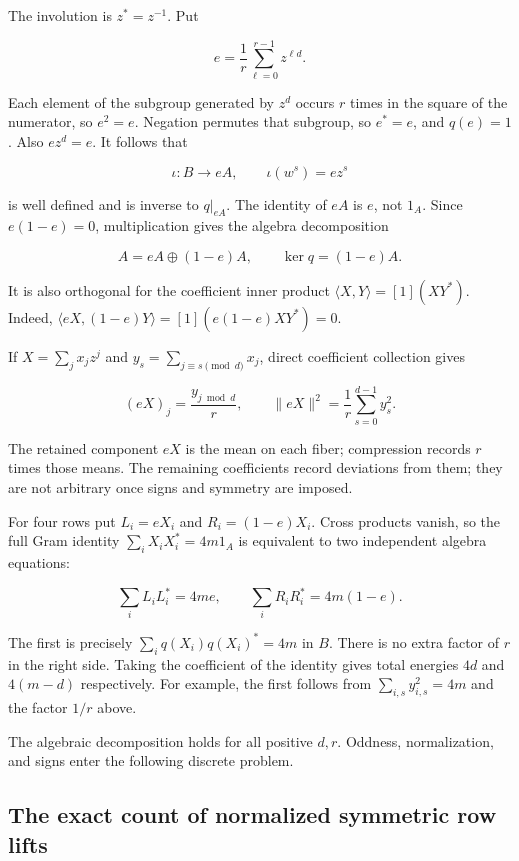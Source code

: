 \documentclass[
  11pt,
]{article}
\begin{document}
The involution is \(z^*=z^{-1}\). Put

\[e=\frac1r\sum_{\ell=0}^{r-1}z^{\ell d}.\]

Each element of the subgroup generated by \(z^d\) occurs \(r\) times in
the square of the numerator, so \(e^2=e\). Negation permutes that
subgroup, so \(e^*=e\), and \(q(e)=1\). Also \(ez^d=e\). It follows that

\[\iota:B\longrightarrow eA,\qquad \iota(w^s)=ez^s\]

is well defined and is inverse to \(q|_{eA}\). The identity of \(eA\) is
\(e\), not \(1_A\). Since \(e(1-e)=0\), multiplication gives the algebra
decomposition

\[A=eA\oplus(1-e)A,\qquad \ker q=(1-e)A.\]

It is also orthogonal for the coefficient inner product
\(\langle X,Y\rangle=[1](XY^*)\). Indeed,
\(\langle eX,(1-e)Y\rangle=[1](e(1-e)XY^*)=0\).

If \(X=\sum_jx_jz^j\) and \(y_s=\sum_{j\equiv s\pmod d}x_j\), direct
coefficient collection gives

\[(eX)_j=\frac{y_{j\bmod d}}r,\qquad
\|eX\|^2=\frac1r\sum_{s=0}^{d-1}y_s^2.\]

The retained component \(eX\) is the mean on each fiber; compression
records \(r\) times those means. The remaining coefficients record
deviations from them; they are not arbitrary once signs and symmetry are
imposed.

For four rows put \(L_i=eX_i\) and \(R_i=(1-e)X_i\). Cross products
vanish, so the full Gram identity \(\sum_iX_iX_i^*=4m1_A\) is equivalent
to two independent algebra equations:

\[\sum_iL_iL_i^*=4me,\qquad
\sum_iR_iR_i^*=4m(1-e).\]

The first is precisely \(\sum_iq(X_i)q(X_i)^*=4m\) in \(B\). There is no
extra factor of \(r\) in the right side. Taking the coefficient of the
identity gives total energies \(4d\) and \(4(m-d)\) respectively. For
example, the first follows from \(\sum_{i,s}y_{i,s}^2=4m\) and the
factor \(1/r\) above.

The algebraic decomposition holds for all positive \(d,r\). Oddness,
normalization, and signs enter the following discrete problem.

\subsection{The exact count of normalized symmetric row
lifts}\label{the-exact-count-of-normalized-symmetric-row-lifts}
\end{document}
